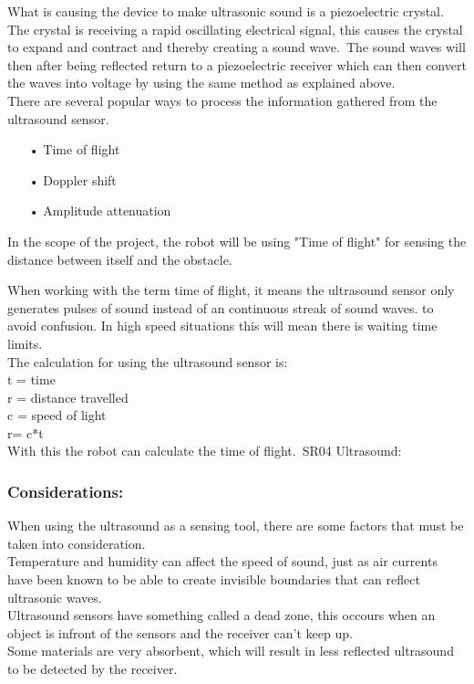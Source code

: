 What is causing the device to make ultrasonic sound is a piezoelectric crystal. The crystal is receiving a rapid oscillating electrical signal, this causes the crystal to expand and contract and thereby creating a sound wave.\ The sound waves will then after being reflected return to a piezoelectric receiver which can then convert the waves into voltage by using the same method as explained above. \\


There are several popular ways to process the information gathered from the ultrasound sensor. \\

\begin{enumerate}
	\item[•]Time of flight
	\item[•]Doppler shift
	\item[•]Amplitude attenuation
\end{enumerate}

In the scope of the project, the robot will be using "Time of flight" for sensing the distance between itself and the obstacle.\

When working with the term time of flight, it means the ultrasound sensor only generates pulses of sound instead of an continuous streak of sound waves. to avoid confusion. In high speed situations this will mean there is waiting time limits.\\ 

The calculation for using the ultrasound sensor is: \\

t = time\\
r = distance travelled\\
c = speed of light\\

r= c*t\\

With this the robot can calculate the time of flight.\
SR04 Ultrasound:\
\subsubsection{Considerations:}
When using the ultrasound as a sensing tool, there are some factors that must be taken into consideration.\\ Temperature and humidity can affect the speed of sound, just as air currents have been known to be able to create invisible boundaries that can reflect ultrasonic waves.\\
Ultrasound sensors have something called a dead zone, this occours when an object is infront of the sensors and the receiver can't keep up.\\
Some materials are very absorbent, which will result in less reflected ultrasound to be detected by the receiver.

